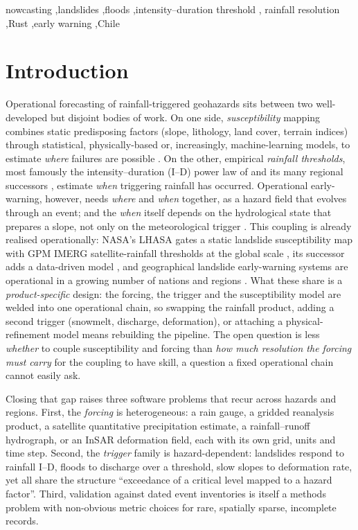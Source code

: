 \documentclass[authoryear,preprint,review,12pt]{elsarticle}
\begin{document}
\begin{frontmatter}
\begin{keyword}
nowcasting \sep landslides \sep floods \sep intensity--duration threshold \sep
rainfall resolution \sep Rust \sep early warning \sep Chile
\end{keyword}

\end{frontmatter}

\linenumbers

\section{Introduction}

Operational forecasting of rainfall-triggered geohazards sits between two
well-developed but disjoint bodies of work. On one side, \emph{susceptibility}
mapping combines static predisposing factors (slope, lithology, land cover,
terrain indices) through statistical, physically-based or, increasingly,
machine-learning models, to estimate \emph{where} failures are possible
\citep{reichenbach2018,merghadi2020}. On the other, empirical \emph{rainfall thresholds}, most
famously the intensity--duration (I--D) power law of \citet{caine1980} and its
many regional successors \citep{guzzetti2007,segoni2018,gariano2016}, estimate \emph{when}
triggering rainfall has occurred. Operational early-warning, however, needs
\emph{where} and \emph{when} together, as a hazard field that evolves through an
event; and the \emph{when} itself depends on the hydrological state that prepares a
slope, not only on the meteorological trigger \citep{bogaard2018}. This coupling is already realised operationally: NASA's
LHASA gates a static landslide susceptibility map with GPM IMERG satellite-rainfall
thresholds at the global scale \citep{kirschbaum2018}, its successor adds a
data-driven model \citep{stanley2021}, and geographical landslide early-warning
systems are operational in a growing number of nations and regions \citep{guzzetti2020}. What these share is a
\emph{product-specific} design: the forcing, the trigger and the susceptibility
model are welded into one operational chain, so swapping the rainfall product,
adding a second trigger (snowmelt, discharge, deformation), or attaching a
physical-refinement model means rebuilding the pipeline. The open question is less
\emph{whether} to couple susceptibility and forcing than \emph{how much resolution
the forcing must carry} for the coupling to have skill, a question a fixed
operational chain cannot easily ask.

Closing that gap raises three software problems that recur across hazards and
regions. First, the \emph{forcing} is heterogeneous: a rain gauge, a gridded
reanalysis product, a satellite quantitative precipitation estimate, a
rainfall--runoff hydrograph, or an InSAR deformation field, each with its own
grid, units and time step. Second, the \emph{trigger} family is hazard-dependent:
landslides respond to rainfall I--D, floods to discharge over a threshold, slow
slopes to deformation rate, yet all share the structure ``exceedance of a
critical level mapped to a hazard factor''. Third, validation against dated event
inventories is itself a methods problem with non-obvious metric choices for rare,
spatially sparse, incomplete records.
\end{document}
